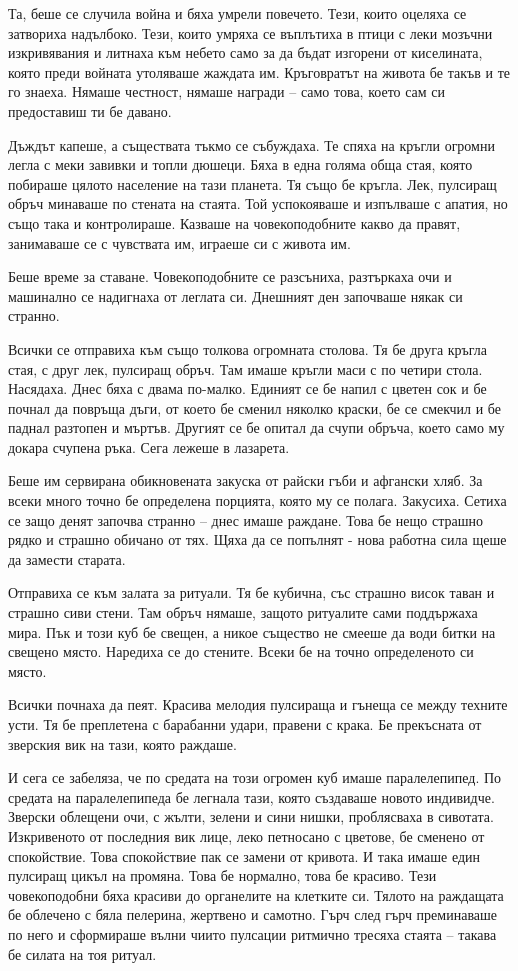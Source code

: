 \documentclass[ebook,openany,12pt]{memoir}
\begin{document}
Та, беше се случила война и бяха умрели повечето. Тези, които оцеляха се затвориха надълбоко. Тези, които умряха се въплътиха в птици с леки мозъчни изкривявания и литнаха към небето само за да бъдат изгорени от киселината, която преди войната утоляваше жаждата им. Кръговратът на живота бе такъв и те го знаеха. Нямаше честност, нямаше награди – само това, което сам си предоставиш ти бе давано.

Дъждът капеше, а съществата тъкмо се събуждаха. Те спяха на кръгли огромни легла с меки завивки и топли дюшеци. Бяха в една голяма обща стая, която побираше цялото население на тази планета. Тя също бе кръгла. Лек, пулсиращ обръч минаваше по стената на стаята. Той успокояваше и изпълваше с апатия, но също така и контролираше. Казваше на човекоподобните какво да правят, занимаваше се с чувствата им, играеше си с живота им.

Беше време за ставане. Човекоподобните се разсъниха, разтъркаха очи и машинално се надигнаха от леглата си. Днешният ден започваше някак си странно.

Всички се отправиха към също толкова огромната столова. Тя бе друга кръгла стая, с друг лек, пулсиращ обръч. Там имаше кръгли маси с по четири стола. Насядаха. Днес бяха с двама по-малко. Единият се бе напил с цветен сок и бе почнал да повръща дъги, от което бе сменил няколко краски, бе се смекчил и бе паднал разтопен и мъртъв. Другият се бе опитал да счупи обръча, което само му докара счупена ръка. Сега лежеше в лазарета. 

Беше им сервирана обикновената закуска от райски гъби и афгански хляб. За всеки много точно бе определена порцията, която му се полага. Закусиха. Сетиха се защо денят започва странно – днес имаше раждане. Това бе нещо страшно рядко и страшно обичано от тях. Щяха да се попълнят - нова работна сила щеше да замести старата.

Отправиха се към залата за ритуали. Тя бе кубична, със страшно висок таван и страшно сиви стени. Там обръч нямаше, защото ритуалите сами поддържаха мира. Пък и този куб бе свещен, а никое същество не смееше да води битки на свещено място. Наредиха се до стените. Всеки бе на точно определеното си място. 

Всички почнаха да пеят. Красива мелодия пулсираща и гънеща се между техните усти. Тя бе преплетена с барабанни удари, правени с крака. Бе прекъсната от зверския вик на тази, която раждаше.

И сега се забеляза, че по средата на този огромен куб имаше паралелепипед. По средата на паралелепипеда бе легнала тази, която създаваше новото индивидче. Зверски облещени очи, с жълти, зелени и сини нишки, проблясваха в сивотата. Изкривеното от последния вик лице, леко петносано с цветове, бе сменено от спокойствие. Това спокойствие пак се замени от кривота. И така имаше един пулсиращ цикъл на промяна. Това бе нормално, това бе красиво. Тези човекоподобни бяха красиви до органелите на клетките си. Тялото на раждащата бе облечено с бяла пелерина, жертвено и самотно. Гърч след гърч преминаваше по него и сформираше вълни чиито пулсации ритмично тресяха стаята – такава бе силата на тоя ритуал. 
\end{document}
